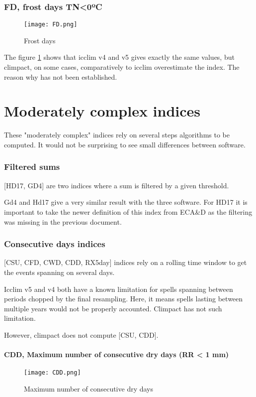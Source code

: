 \documentclass[a4paper,11pt]{article}
\begin{document}
\section{FD, frost days TN<0ºC}

    \begin{figure}[!hbt]
        \centering
        \texttt{[image: FD.png]}
        \caption{Frost days}
        \label{figure/fd}
    \end{figure}
    
    The figure \ref{figure/fd} shows that icclim v4 and v5 gives exactly the same values, but climpact, on some cases, comparatively to icclim overestimate the index.
    The reason why has not been established.
    

\part{Moderately complex indices}
    These "moderately complex" indices rely on several steps algorithms
    to be computed.
    It would not be surprising to see small differences between software.

\section{Filtered sums}
    [HD17, GD4] are two indices where a sum is filtered by a given threshold.

    Gd4 and Hd17 give a very similar result with the three software.
    For HD17 it is important to take the newer definition of this index from ECA\&D as the filtering was missing in the previous document.

\section{Consecutive days indices} \label{section/consecutive_days}
    [CSU, CFD, CWD, CDD, RX5day] indices rely on a rolling time window to get the events spanning on several days.

    Icclim v5 and v4 both have a known limitation for spells spanning between periods chopped by the final resampling. Here, it means spells lasting between multiple years would not be properly accounted.
    Climpact has not such limitation.

    However, climpact does not compute [CSU, CDD].

\subsection{CDD, Maximum number of consecutive dry days (RR < 1 mm)}
    \begin{figure}[!hbt]
        \centering
        \texttt{[image: CDD.png]}
        \caption{Maximum number of consecutive dry days}
        \label{figure/cdd}
    \end{figure}
\end{document}

